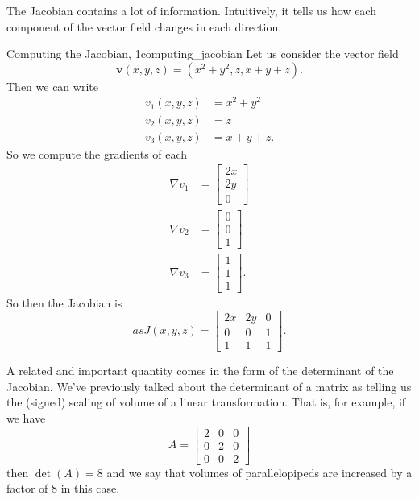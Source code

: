         The Jacobian contains a lot of information. Intuitively, it tells us how each component of the vector field changes in each direction.  
        
        \begin{ex}{Computing the Jacobian, 1}{computing_jacobian}
        Let us consider the vector field
        \[
        \mathbf{v}(x,y,z) = (x^2+y^2,z,x+y+z).
        \]
        Then we can write
        \begin{align*}
            v_1(x,y,z)&= x^2+y^2\\
            v_2(x,y,z)&= z\\
            v_3(x,y,z)&= x+y+z.
        \end{align*}
        So we compute the gradients of each
        \begin{align*}
            \nabla v_1 &= \begin{bmatrix} 2x \\ 2y \\ 0 \end{bmatrix}\\
            \nabla v_2 &= \begin{bmatrix} 0 \\ 0 \\ 1 \end{bmatrix}\\
            \nabla v_3 &= \begin{bmatrix} 1 \\ 1 \\ 1 \end{bmatrix}.
        \end{align*}
        So then the Jacobian is
        \[as
        J(x,y,z) = \begin{bmatrix} 2x & 2y & 0 \\ 0 & 0 & 1\\ 1 & 1 & 1 \end{bmatrix}.
        \]
        \end{ex}
        
        A related and important quantity comes in the form of the determinant of the Jacobian.  We've previously talked about the determinant of a matrix as telling us the (signed) scaling of volume of a linear transformation.  That is, for example, if we have
        \[
        A = \begin{bmatrix} 2 & 0 & 0\\ 0 & 2 & 0\\ 0 & 0 & 2 \end{bmatrix}
        \]
        then $\det(A)=8$ and we say that volumes of parallelopipeds are increased by a factor of $8$ in this case.  
        
